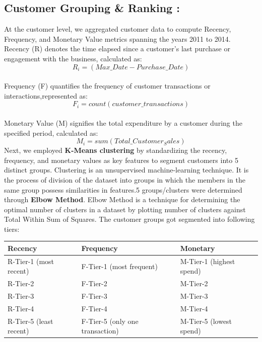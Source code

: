 \documentclass[11pt]{article} %
\begin{document}
\subsection*{Customer Grouping \& Ranking :}
At the customer level, we aggregated customer data to compute Recency, Frequency, and Monetary Value metrics spanning the years 2011 to 2014. \\Recency (R) denotes the time elapsed since a customer's last purchase or engagement with the business, calculated as:\[R_i = (Max\_Date - Purchase\_Date)\]
\\Frequency (F) quantifies the frequency of customer transactions or interactions,represented as:\[F_i = count(customer\_transactions)\]
\\Monetary Value (M) signifies the total expenditure by a customer during the specified period, calculated as:\[M_i = sum(Total\_Customer_Sales)\]
Next, we employed \textbf{K-Means clustering} by standardizing the recency, frequency, and monetary values as key features to segment customers into 5 distinct groups. Clustering is an unsupervised machine-learning technique. It is the process of division of the dataset into groups in which the members in the same group possess similarities in features\cite{6}.5 groups/clusters were determined through \textbf{Elbow Method}. Elbow Method is a technique for determining the optimal number of clusters in a dataset by plotting number of clusters against Total Within Sum of Squares.
The customer groups got segmented into following tiers:
\begin{table}[H]
\centering
\begin{tabular}{@{}lll@{}}
\toprule
\textbf{Recency}        & \textbf{Frequency}              & \textbf{Monetary}        \\ \midrule
R-Tier-1 (most recent)  & F-Tier-1 (most frequent)        & M-Tier-1 (highest spend) \\
R-Tier-2                & F-Tier-2                        & M-Tier-2                 \\
R-Tier-3                & F-Tier-3                        & M-Tier-3                 \\
R-Tier-4                & F-Tier-4                        & M-Tier-4                 \\
R-Tier-5 (least recent) & F-Tier-5 (only one transaction) & M-Tier-5 (lowest spend)  \\ \bottomrule
\end{tabular}
\end{table}
\end{document}
